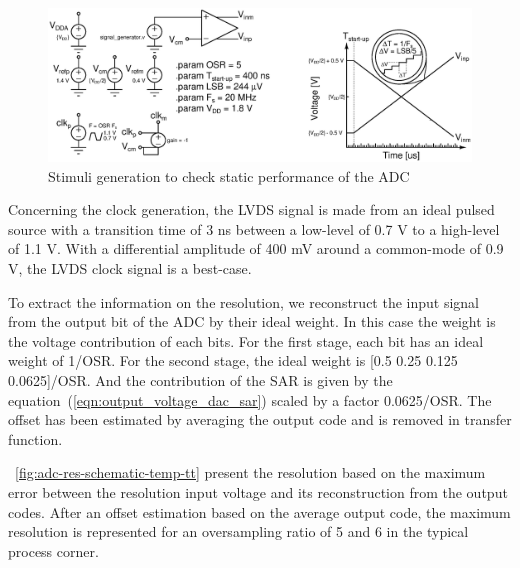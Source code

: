 \begin{figure}[htp]
    \centering
    \includegraphics[width=\textwidth]{Chapter5/Figs/adc_chip/input_signal_generator.ps}
    \caption{Stimuli generation to check static performance of the ADC}
    \label{fig:tb_adc_stimuli}
\end{figure}

Concerning the clock generation, the LVDS signal is made from an ideal pulsed source with a transition time of 3 ns between a low-level of 0.7 V to a high-level of 1.1 V. With a differential amplitude of 400 mV around a common-mode of 0.9 V, the LVDS clock signal is a best-case.

To extract the information on the resolution, we reconstruct the input signal from the output bit of the ADC by their ideal weight. In this case the weight is the voltage contribution of each bits. For the first stage, each bit has an ideal weight of 1/OSR. For the second stage, the ideal weight is [0.5 0.25 0.125 0.0625]/OSR. And the contribution of the SAR is given by the equation~(\ref{eqn:output_voltage_dac_sar}) scaled by a factor 0.0625/OSR\@. The offset has been estimated by averaging the output code and is removed in transfer function. 

\figurename~\ref{fig:adc-res-schematic-temp-tt} present the resolution based on the maximum error between the resolution input voltage and its reconstruction from the output codes. After an offset estimation based on the average output code, the maximum resolution is represented for an oversampling ratio of 5 and 6 in the typical process corner.

